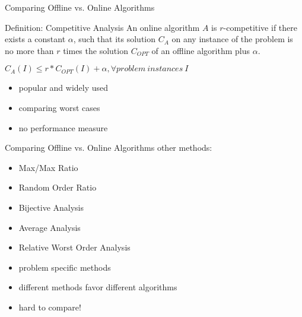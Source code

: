 \documentclass{beamer}
\begin{document}
\begin{frame}{Comparing Offline vs. Online Algorithms}
  \begin{block}{Definition: Competitive Analysis}
    An online algorithm $A$ is \alert{$r$-competitive} if there exists a constant $\alpha$, such that its solution $C_A$ on any instance of the problem is no more than $r$ times the solution $C_{OPT}$ of an offline algorithm plus $\alpha$. \\
    
    \vspace{5pt}
    
    \begin{center}
      $C_A(I) \le r * C_{OPT}(I) + \alpha, \forall problem\ instances\ I$
    \end{center}

    \vspace{5pt}
  \end{block}

  \begin{itemize}
    \item<2-> popular and widely used
    \item<3-> comparing worst cases
    \item<4-> no performance measure
  \end{itemize}
\end{frame}

\begin{frame}{Comparing Offline vs. Online Algorithms}
  other methods:
  \begin{itemize}
    \item Max/Max Ratio
    \item Random Order Ratio
    \item Bijective Analysis
    \item Average Analysis
    \item Relative Worst Order Analysis
    \item problem specific methods
  \end{itemize}

  \vspace{10pt}

  \begin{itemize}
    \item different methods favor different algorithms
    \item hard to compare!
  \end{itemize}
\end{frame}
\end{document}
